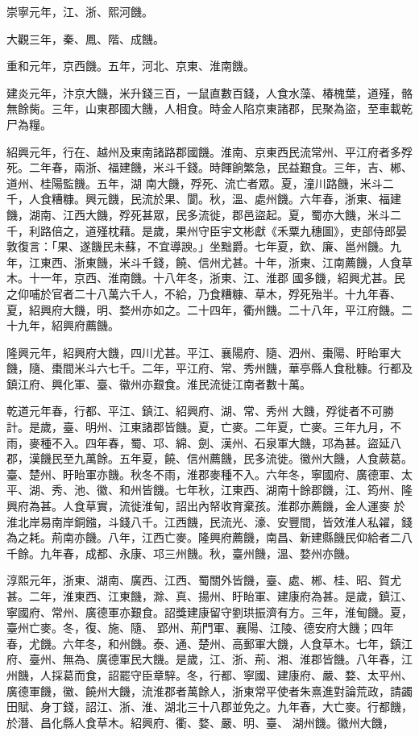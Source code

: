 \begin{pinyinscope}
 崇寧元年，江、浙、熙河饑。



 大觀三年，秦、鳳、階、成饑。



 重和元年，京西饑。五年，河北、京東、淮南饑。



 建炎元年，汴京大饑，米升錢三百，一鼠直數百錢，人食水藻、椿槐葉，道殣，骼無餘胔。三年，山東郡國大饑，人相食。時金人陷京東諸郡，民聚為盜，至車載乾尸為糧。



 紹興元年，行在、越州及東南諸路郡國饑。淮南、京東西民流常州、平江府者多殍死。二年春，兩浙、福建饑，米斗千錢。時餫餉繁急，民益艱食。三年，吉、郴、道州、桂陽監饑。五年，湖
 南大饑，殍死、流亡者眾。夏，潼川路饑，米斗二千，人食糟糠。興元饑，民流於果、閬。秋，溫、處州饑。六年春，浙東、福建饑，湖南、江西大饑，殍死甚眾，民多流徙，郡邑盜起。夏，蜀亦大饑，米斗二千，利路倍之，道殣枕藉。是歲，果州守臣宇文彬獻《禾粟九穗圖》，吏部侍郎晏敦復言：「果、遂饑民未蘇，不宜導諛。」坐黜爵。七年夏，欽、廉、邕州饑。九年，江東西、浙東饑，米斗千錢，饒、信州尤甚。十年，浙東、江南薦饑，人食草木。十一年，京西、淮南饑。十八年冬，浙東、江、淮郡
 國多饑，紹興尤甚。民之仰哺於官者二十八萬六千人，不給，乃食糟糠、草木，殍死殆半。十九年春、夏，紹興府大饑，明、婺州亦如之。二十四年，衢州饑。二十八年，平江府饑。二十九年，紹興府薦饑。



 隆興元年，紹興府大饑，四川尤甚。平江、襄陽府、隨、泗州、棗陽、盱眙軍大饑，隨、棗間米斗六七千。二年，平江府、常、秀州饑，華亭縣人食秕糠。行都及鎮江府、興化軍、臺、徽州亦艱食。淮民流徙江南者數十萬。



 乾道元年春，行都、平江、鎮江、紹興府、湖、常、秀州
 大饑，殍徙者不可勝計。是歲，臺、明州、江東諸郡皆饑。夏，亡麥。二年夏，亡麥。三年九月，不雨，麥種不入。四年春，蜀、邛、綿、劍、漢州、石泉軍大饑，邛為甚。盜延八郡，漢饑民至九萬餘。五年夏，饒、信州薦饑，民多流徙。徽州大饑，人食蕨葛。臺、楚州、盱眙軍亦饑。秋冬不雨，淮郡麥種不入。六年冬，寧國府、廣德軍、太平、湖、秀、池、徽、和州皆饑。七年秋，江東西、湖南十餘郡饑，江、筠州、隆興府為甚。人食草實，流徙淮甸，詔出內帑收育棄孩。淮郡亦薦饑，金人運麥
 於淮北岸易南岸銅鏹，斗錢八千。江西饑，民流光、濠、安豐間，皆效淮人私糴，錢為之耗。荊南亦饑。八年，江西亡麥。隆興府薦饑，南昌、新建縣饑民仰給者二八千餘。九年春，成都、永康、邛三州饑。秋，臺州饑，溫、婺州亦饑。



 淳熙元年，浙東、湖南、廣西、江西、蜀關外皆饑，臺、處、郴、桂、昭、賀尤甚。二年，淮東西、江東饑，滁、真、揚州、盱眙軍、建康府為甚。是歲，鎮江、寧國府、常州、廣德軍亦艱食。詔獎建康留守劉珙振濟有方。三年，淮甸饑。夏，臺州亡麥。冬，復、施、隨、
 郢州、荊門軍、襄陽、江陵、德安府大饑；四年春，尤饑。六年冬，和州饑。泰、通、楚州、高郵軍大饑，人食草木。七年，鎮江府、臺州、無為、廣德軍民大饑。是歲，江、浙、荊、湘、淮郡皆饑。八年春，江州饑，人採葛而食，詔罷守臣章騂。冬，行都、寧國、建康府、嚴、婺、太平州、廣德軍饑，徽、饒州大饑，流淮郡者萬餘人，浙東常平使者朱熹進對論荒政，請蠲田賦、身丁錢，詔江、浙、淮、湖北三十八郡並免之。九年春，大亡麥。行都饑，於潛、昌化縣人食草木。紹興府、衢、婺、嚴、明、臺、
 湖州饑。徽州大饑，




\end{pinyinscope}
